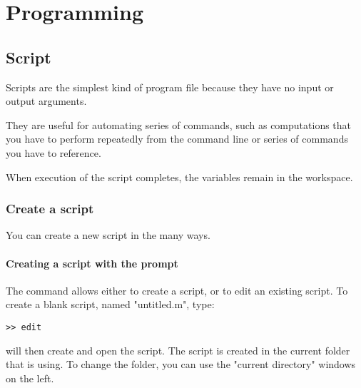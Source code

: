 \chapter{Programming}
\label{chap-code}

\section{Script}
	Scripts are the simplest kind of program file because they have no input or output arguments. 

	They are useful for automating series of \matlab commands, such as computations that you have to perform repeatedly from the command line or series of commands you have to reference.

	When execution of the script completes, the variables remain in the \matlab workspace. 



	\subsection{Create a script}
		You can create a new script in the many ways.
		
		\subsubsection{Creating a script with the prompt}
			The  command allows either to create a script, or to edit an existing script.
			To create a blank script, named "untitled.m", type:
\begin{lstlisting}
>> edit
\end{lstlisting}
			\matlab will then create and open the script.
			The script is created in the current folder that \matlab is using. 
			To change the folder, you can use the "current directory" windows on the left.
		
